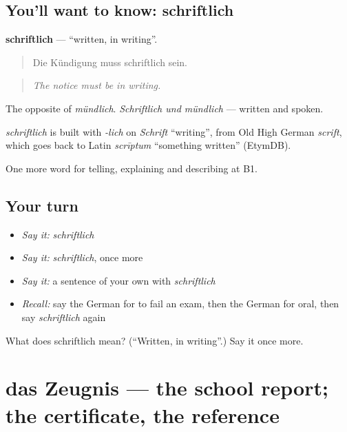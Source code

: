 \subsection*{You'll want to know: schriftlich}
\textbf{schriftlich} — \textquotedblleft{}written, in writing\textquotedblright{}.

\begin{quote}
Die Kündigung muss schriftlich sein.
\end{quote}

\begin{quote}
\emph{The notice must be in writing.}
\end{quote}

The opposite of \emph{mündlich}. \emph{Schriftlich und mündlich} — written and spoken.

\begin{cousinweb}
\emph{schriftlich} is built with \emph{-lich} on \emph{Schrift} \textquotedblleft{}writing\textquotedblright{}, from Old High German \emph{scrift}, which goes back to Latin \emph{scrīptum} \textquotedblleft{}something written\textquotedblright{} (EtymDB).
\end{cousinweb}

\begin{grammarlens}[title={What you've built}]
One more word for telling, explaining and describing at B1.
\end{grammarlens}

\subsection*{Your turn}
\begin{itemize}
\raggedright
  \item \emph{Say it:} \emph{schriftlich}
  \item \emph{Say it:} \emph{schriftlich}, once more
  \item \emph{Say it:} a sentence of your own with \emph{schriftlich}
  \item \emph{Recall:} say the German for to fail an exam, then the German for oral, then say \emph{schriftlich} again
\end{itemize}

\begin{tcolorbox}[breakable,colback=teal!4,colframe=teal!35!black,title={Before you move on}]
What does schriftlich mean? (\textquotedblleft{}Written, in writing\textquotedblright{}.) Say it once more.
\end{tcolorbox}
\section[das Zeugnis]{das Zeugnis — the school report; the certificate, the reference}


